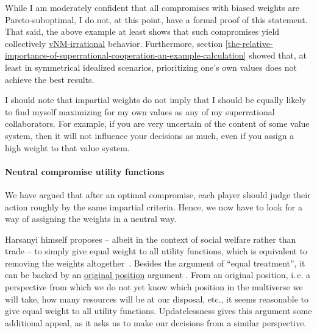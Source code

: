 While I am moderately confident that all compromises with biased weights
are Pareto-suboptimal, I do not, at this point, have a formal proof of
this statement. That said, the above example at least shows that such
compromises yield collectively
\href{https://en.wikipedia.org/wiki/Von_Neumann\%E2\%80\%93Morgenstern_utility_theorem\#The_axioms}{vNM-irrational}
behavior. Furthermore, section
\ref{the-relative-importance-of-superrational-cooperation-an-example-calculation} showed that, at least in symmetrical idealized
scenarios, prioritizing one's own values does not achieve the best
results.

I should note that impartial weights do not imply that I should be
equally likely to find myself maximizing for my own values as any of my
superrational collaborators. For example, if you are very uncertain of
the content of some value system, then it will not influence your
decisions as much, even if you assign a high weight to that value
system.

\paragraph{Neutral compromise utility
functions}\label{neutral-compromise-utility-functions}

We have argued that after an optimal compromise, each player should
judge their action roughly by the same impartial criteria. Hence, we now
have to look for a way of assigning the weights in a neutral way.

Harsanyi himself proposes -- albeit in
the context of social welfare rather than trade -- to simply give equal
weight to all utility functions, which is equivalent to removing the
weights altogether~\parencite{Harsanyi1979-ac}. Besides the argument of ``equal treatment'', it can
be backed by an
\href{https://en.wikipedia.org/wiki/Original_position}{original
position} argument
\parencite{Harsanyi1953-mj,Harsanyi1955-ou,Freeman2016-kg}.
From an original position, i.\,e. a perspective from which we do not yet
know which position in the multiverse we will take, how many resources
will be at our disposal, etc., it seems reasonable to give equal weight
to all utility functions. Updatelessness gives this argument some
additional appeal, as it asks us to make our decisions from a similar
perspective.

